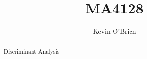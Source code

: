\documentclass[12pt]{article}
\title{MA4128}
\author{Kevin O'Brien}
\begin{document}
\maketitle

\begin{abstract}
Discriminant Analysis
\end{abstract}
\end{document}
